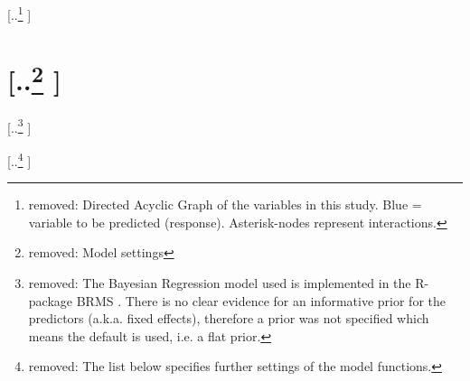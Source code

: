 \documentclass[unnumsec,webpdf,modern,medium]{oup-authoring-template}
\providecommand{\DIFdeltex}[1]{{\protect\color{red} [..\footnote{removed: #1} ]}} %
\providecommand{\DIFdel}[1]{\texorpdfstring{\DIFdeltex{#1}}{}} %
\begin{document}

{%
\DIFdel{Directed Acyclic Graph of the variables in this study. Blue = variable to be predicted (response). Asterisk-nodes represent interactions.}}

\section{\DIFdel{Model settings}}
\addtocounter{section}{-1}%
\DIFdel{The Bayesian Regression model used is implemented in the R-package BRMS \citep{burkner2017brms}. There is no clear evidence for an informative prior for the predictors (a.k.a. fixed effects), therefore a prior was not specified which means the default is used, i.e. a flat prior.
}%

\DIFdel{The list below specifies further settings of the model functions.
}%
\end{document}

